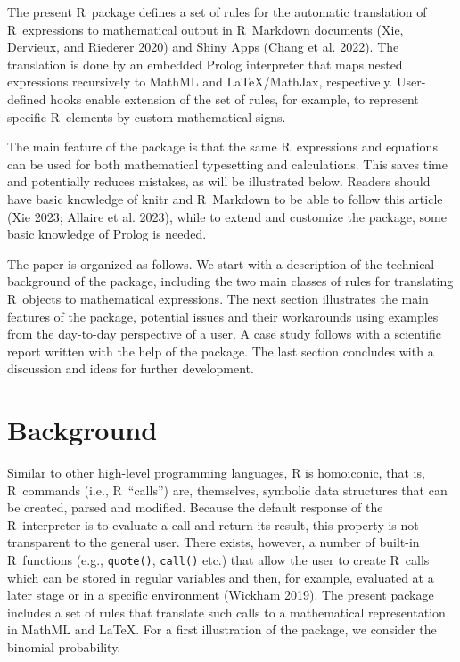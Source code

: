The present R~package defines a set of rules for the automatic translation of
R~expressions to mathematical output in R~Markdown documents (Xie, Dervieux, and Riederer 2020) and
Shiny Apps (Chang et al. 2022). The translation is done by an embedded Prolog
interpreter that maps nested expressions recursively to MathML and
LaTeX/MathJax, respectively. User-defined hooks enable extension of the set of
rules, for example, to represent specific R~elements by custom mathematical
signs.

The main feature of the package is that the same R~expressions and equations
can be used for both mathematical typesetting and calculations. This saves time
and potentially reduces mistakes, as will be illustrated below. Readers should
have basic knowledge of knitr and R~Markdown to be able to follow this
article (Xie 2023; Allaire et al. 2023), while to extend and customize the package,
some basic knowledge of Prolog is needed.

The paper is organized as follows. We start with a description of the
technical background of the package, including the two main classes of rules for
translating R~objects to mathematical expressions. The next section illustrates
the main features of the  package, potential issues and their
workarounds using examples from the day-to-day perspective of a user. A case
study follows with a scientific report written with the help of the package. The
last section concludes with a discussion and ideas for further development.

\hypertarget{background}{%
\section{Background}\label{background}}

Similar to other high-level programming languages, R is homoiconic, that is,
R~commands (i.e., R~``calls'') are, themselves, symbolic data structures that
can be created, parsed and modified. Because the default response of the
R~interpreter is to evaluate a call and return its result, this property is not
transparent to the general user. There exists, however, a number of built-in
R~functions (e.g., \texttt{quote()}, \texttt{call()} etc.) that allow the user to create R~calls
which can be stored in regular variables and then, for example, evaluated at
a later stage or in a specific environment (Wickham 2019). The present package
includes a set of rules that translate such calls to a mathematical
representation in MathML and LaTeX. For a first illustration of the 
package, we consider the binomial probability.

